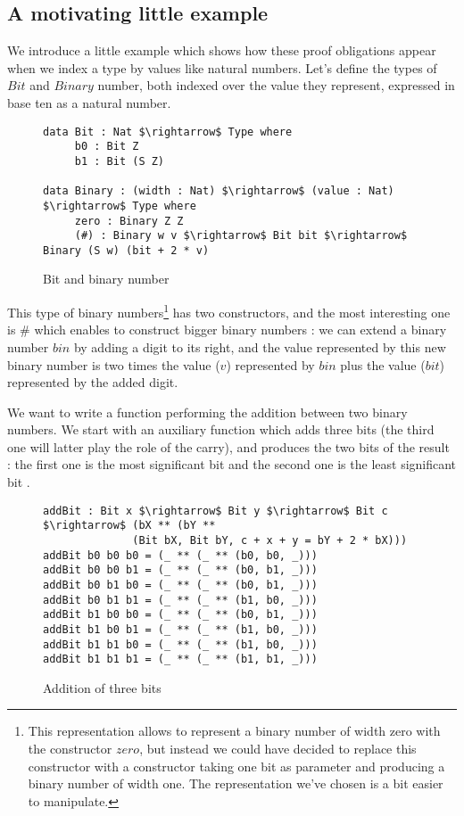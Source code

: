 \subsection{A motivating little example}
We introduce a little example which shows how these proof obligations appear when we index a type by values like natural numbers.
Let's define the types of $Bit$ and $Binary$ number, both indexed over the value they represent, expressed in base ten as a natural number.
\begin{figure}[H]
\figrule
\begin{center}
\begin{lstlisting}
data Bit : Nat $\rightarrow$ Type where
     b0 : Bit Z
     b1 : Bit (S Z)
     
data Binary : (width : Nat) $\rightarrow$ (value : Nat) $\rightarrow$ Type where
     zero : Binary Z Z
     (#) : Binary w v $\rightarrow$ Bit bit $\rightarrow$ Binary (S w) (bit + 2 * v)
\end{lstlisting}
\end{center}
\caption{Bit and binary number}
\figrule
\end{figure}

This type of binary numbers\footnote{This representation allows to represent a binary number of width zero with the constructor $zero$, but instead we could have decided to replace this constructor with a constructor taking one bit as parameter and producing a binary number of width one. The representation we've chosen is a bit easier to manipulate.}  has two constructors, and the most interesting one is $\#$ which enables to construct bigger binary numbers : we can extend a binary number $bin$ by adding a digit to its right, and the value represented by this new binary number is two times the value ($v$) represented by $bin$ plus the value ($bit$) represented by the added digit.

We want to write a function performing the addition between two binary numbers.
We start with an auxiliary function which adds three bits (the third one will latter play the role of the carry), and produces the two bits of the result : the first one is the most significant bit and the second one is the least significant bit .

\begin{figure}[H]
\figrule
\begin{center}
\begin{lstlisting}
addBit : Bit x $\rightarrow$ Bit y $\rightarrow$ Bit c $\rightarrow$ (bX ** (bY ** 
              (Bit bX, Bit bY, c + x + y = bY + 2 * bX)))
addBit b0 b0 b0 = (_ ** (_ ** (b0, b0, _)))
addBit b0 b0 b1 = (_ ** (_ ** (b0, b1, _)))
addBit b0 b1 b0 = (_ ** (_ ** (b0, b1, _)))
addBit b0 b1 b1 = (_ ** (_ ** (b1, b0, _)))
addBit b1 b0 b0 = (_ ** (_ ** (b0, b1, _)))
addBit b1 b0 b1 = (_ ** (_ ** (b1, b0, _)))
addBit b1 b1 b0 = (_ ** (_ ** (b1, b0, _)))
addBit b1 b1 b1 = (_ ** (_ ** (b1, b1, _)))
\end{lstlisting}
\end{center}
\caption{Addition of three bits}
\figrule
\end{figure}

